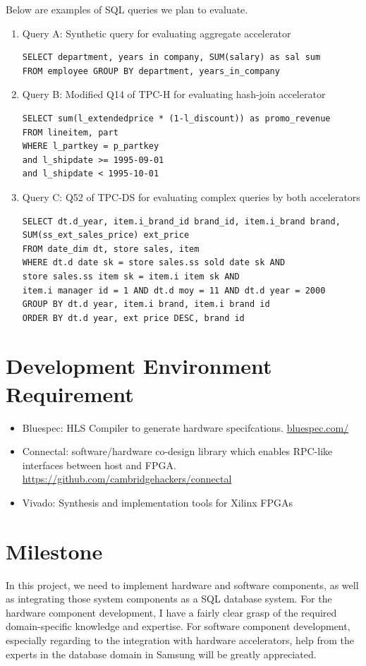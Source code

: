 \documentclass{article}
\begin{document}
Below are examples of SQL queries we plan to evaluate.

\begin{enumerate}

\item Query A: Synthetic query for evaluating aggregate accelerator 
\begin{verbatim}
SELECT department, years in company, SUM(salary) as sal sum
FROM employee GROUP BY department, years_in_company
\end{verbatim}

\item Query B: Modified Q14 of TPC-H for evaluating hash-join accelerator
\begin{verbatim}
SELECT sum(l_extendedprice * (1-l_discount)) as promo_revenue
FROM lineitem, part
WHERE l_partkey = p_partkey
and l_shipdate >= 1995-09-01 
and l_shipdate < 1995-10-01
\end{verbatim}

\item Query C: Q52 of TPC-DS for evaluating complex queries by both accelerators
\begin{verbatim}
SELECT dt.d_year, item.i_brand_id brand_id, item.i_brand brand,
SUM(ss_ext_sales_price) ext_price
FROM date_dim dt, store sales, item
WHERE dt.d date sk = store sales.ss sold date sk AND
store sales.ss item sk = item.i item sk AND
item.i manager id = 1 AND dt.d moy = 11 AND dt.d year = 2000
GROUP BY dt.d year, item.i brand, item.i brand id
ORDER BY dt.d year, ext price DESC, brand id
\end{verbatim}
\end{enumerate}


\section{Development Environment Requirement}
\begin{itemize}
\item Bluespec: HLS Compiler to generate hardware specifcations. \url{bluespec.com/}
\item Connectal: software/hardware co-design library which enables RPC-like
  interfaces between host and
  FPGA. \url{https://github.com/cambridgehackers/connectal}
\item Vivado: Synthesis and implementation tools for Xilinx FPGAs
\end{itemize}

\section{Milestone}
In this project, we need to implement hardware and software components, as well as integrating those system components as a SQL database system.
For the hardware component development, I have a fairly clear grasp of the required domain-specific knowledge and expertise.
For software component development, especially regarding to the integration with hardware accelerators, help from the experts in the database domain in Samsung will be greatly appreciated.
\end{document}
